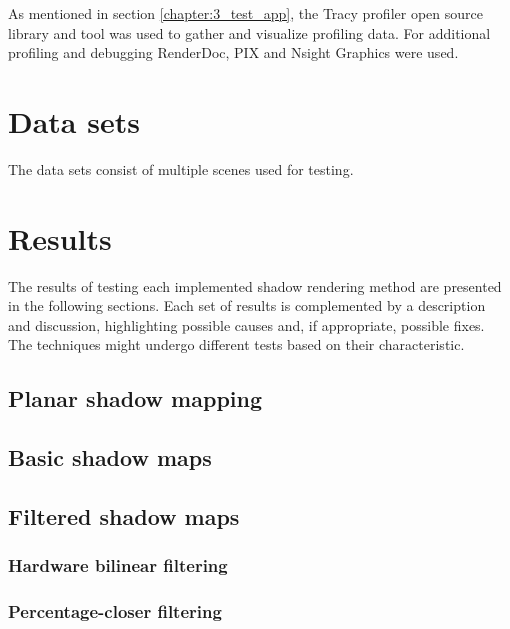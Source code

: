 As mentioned in section \ref{chapter:3_test_app}, the Tracy profiler open source library and tool was used to gather and visualize profiling data. For additional profiling and debugging RenderDoc, PIX and Nsight Graphics were used.

\section{Data sets}
The data sets consist of multiple scenes used for testing.

\section{Results}

The results of testing each implemented shadow rendering method are presented in the following sections. Each set of results is complemented by a description and discussion, highlighting possible causes and, if appropriate, possible fixes. The techniques might undergo different tests based on their characteristic.

\subsection{Planar shadow mapping}

\subsection{Basic shadow maps}

\subsection{Filtered shadow maps}

\subsubsection{Hardware bilinear filtering}

\subsubsection{Percentage-closer filtering}

